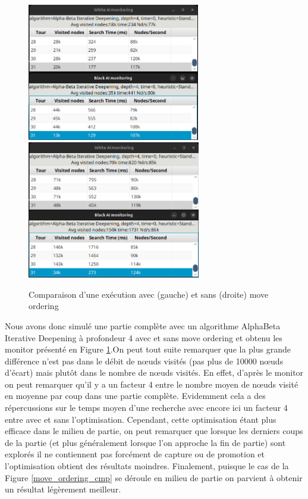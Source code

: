 \documentclass{article}
\begin{document}
\begin{figure}[h]
    \centering
    \includegraphics[width=\textwidth,height=6.0cm,keepaspectratio]{with_mo.png}
    \includegraphics[width=\textwidth,height=6.0cm,keepaspectratio]{without_mo.png}
    \caption{Comparaison d'une exécution avec (gauche) et sans (droite) move ordering}
    \label{move_ordering_cmp_monitor}
\end{figure}
\FloatBarrier

Nous avons donc simulé une partie complète avec un algorithme AlphaBeta Iterative Deepening à profondeur 4 avec et sans move ordering et obtenu les monitor
présenté en Figure \ref{move_ordering_cmp_monitor}.On peut tout suite remarquer que la plus grande différence n'est pas dans le débit de nœuds visités (pas plus de 10000 nœuds d'écart) mais plutôt dans le nombre de nœuds visités.
En effet, d'après le monitor on peut remarquer qu'il y a un facteur 4 entre le nombre moyen de nœuds visité en moyenne par coup dans une partie complète. Evidemment cela a des répercussions
sur le temps moyen d'une recherche avec encore ici un facteur 4 entre avec et sans l'optimisation. Cependant, cette optimisation étant plus efficace dans le milieu de partie, on peut remarquer
que lorsque les derniers coups de la partie (et plus généralement lorsque l'on approche la fin de partie) sont explorés il ne contiennent pas forcément de capture ou de promotion et l'optimisation
obtient des résultats moindres. Finalement, puisque le cas de la Figure \ref{move_ordering_cmp} se déroule en milieu de partie on parvient à obtenir un résultat légèrement meilleur.
\end{document}
